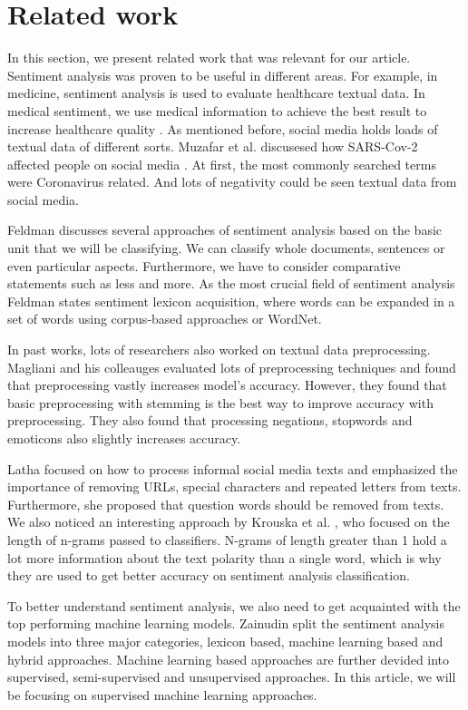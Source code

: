 \documentclass[conference]{IEEEtran}
\begin{document}
\section{Related work}
In this section, we present related work that was relevant for our article. Sentiment analysis was proven to be useful in different areas. For example, in medicine, sentiment analysis is used to evaluate healthcare textual data. In medical sentiment, we use medical information to achieve the best result to increase healthcare quality \cite{DENECKE201517}. As mentioned before, social media holds loads of textual data of different sorts. Muzafar et al. discusesed how SARS-Cov-2 affected people on social media \cite{covid19}. At first, the most commonly searched terms were Coronavirus related. And lots of negativity could be seen textual data from social media. 

Feldman \cite{feldman} discusses several approaches of sentiment analysis based on the basic unit that we will be classifying. We can classify whole documents, sentences or even particular aspects. Furthermore, we have to consider comparative statements such as less and more. As the most crucial field of sentiment analysis Feldman states sentiment lexicon acquisition, where words can be expanded in a set of words using corpus-based approaches or WordNet.

In past works, lots of researchers also worked on textual data preprocessing. Magliani and his colleauges \cite{magliani} evaluated lots of preprocessing techniques and found that preprocessing vastly increases model's accuracy. However, they found that basic preprocessing with stemming is the best way to improve accuracy with preprocessing. They also found that processing negations, stopwords and emoticons also slightly increases accuracy.

Latha \cite{latha} focused on how to process informal social media texts and emphasized the importance of removing URLs, special characters and repeated letters from texts. Furthermore, she proposed that question words should be removed from texts. We also noticed an interesting approach by Krouska et al. \cite{krouska}, who focused on the length of n-grams passed to classifiers. N-grams of length greater than 1 hold a lot more information about the text polarity than a single word, which is why they are used to get better accuracy on sentiment analysis classification.

To better understand sentiment analysis, we also need to get acquainted with the top performing machine learning models. Zainudin \cite{zainudin} split the sentiment analysis models into three major categories, lexicon based, machine learning based and hybrid approaches. Machine learning based approaches are further devided into supervised, semi-supervised and unsupervised approaches. In this article, we will be focusing on supervised machine learning approaches.
\end{document}
